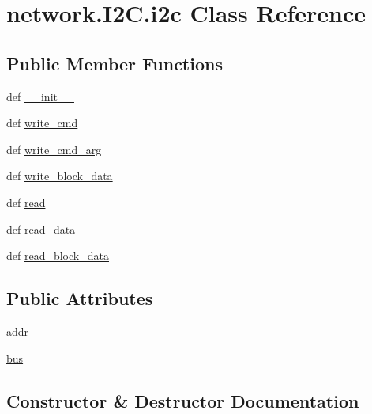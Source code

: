 \hypertarget{classnetwork_1_1I2C_1_1i2c}{}\section{network.\+I2\+C.\+i2c Class Reference}
\label{classnetwork_1_1I2C_1_1i2c}
\subsection*{Public Member Functions}
\begin{DoxyCompactItemize}
\item 
def \hyperlink{classnetwork_1_1I2C_1_1i2c_a4c67f9c04de709214b672c552e1216dd}{\+\_\+\+\_\+init\+\_\+\+\_\+}
\item 
def \hyperlink{classnetwork_1_1I2C_1_1i2c_a88e5789401d5b33a462412c38f5b1c2c}{write\+\_\+cmd}
\item 
def \hyperlink{classnetwork_1_1I2C_1_1i2c_a5254eef4f67541372a8e0e70bd846593}{write\+\_\+cmd\+\_\+arg}
\item 
def \hyperlink{classnetwork_1_1I2C_1_1i2c_ae2eb38185381cb2307b3f3ca5cd819af}{write\+\_\+block\+\_\+data}
\item 
def \hyperlink{classnetwork_1_1I2C_1_1i2c_a92d95fdee4c3dce774e083f566436c84}{read}
\item 
def \hyperlink{classnetwork_1_1I2C_1_1i2c_a57e1f004ef70ea82c9410392662e7412}{read\+\_\+data}
\item 
def \hyperlink{classnetwork_1_1I2C_1_1i2c_a105b6381dad9576d206794d99ac31d6d}{read\+\_\+block\+\_\+data}
\end{DoxyCompactItemize}
\subsection*{Public Attributes}
\begin{DoxyCompactItemize}
\item 
\hyperlink{classnetwork_1_1I2C_1_1i2c_a2b5c11f2acf663fa0349d18714a60db6}{addr}
\item 
\hyperlink{classnetwork_1_1I2C_1_1i2c_a60c56af8dc524a1ef92e36e97d8927c7}{bus}
\end{DoxyCompactItemize}


\subsection{Constructor \& Destructor Documentation}
\hypertarget{classnetwork_1_1I2C_1_1i2c_a4c67f9c04de709214b672c552e1216dd}{}
